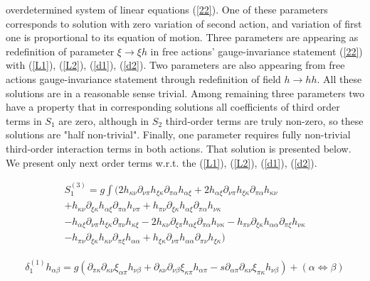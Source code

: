 \documentclass[a4paper,12pt]{article}
\begin{document}
overdetermined system of linear equations (\ref{22}). One of these
parameters corresponds to solution with zero variation of second
action, and variation of first one is proportional to its equation
of motion. Three parameters are appearing as redefinition of
parameter $\xi \rightarrow \xi h$ in free actions'
gauge-invariance statement (\ref{22}) with (\ref{L1}), (\ref{L2}),
(\ref{d1}), (\ref{d2}). Two parameters are also appearing from
free actions gauge-invariance statement through redefinition of
field $h\rightarrow hh$. All these solutions are in a reasonable
sense trivial. Among remaining three parameters two have a
property that in corresponding solutions all coefficients of third
order terms in $S_{1}$ are zero, although in $S_{2}$ third-order
terms are truly non-zero, so these solutions are "half
non-trivial". Finally, one parameter requires fully non-trivial
third-order interaction terms in both actions. That solution is
presented below. We present only next order terms w.r.t. the
(\ref{L1}), (\ref{L2}), (\ref{d1}), (\ref{d2}).


\begin{equation}
\begin{array}{l}
 S_1^{(3)}  = g\int {(2h_{\kappa \nu } \partial _{\nu \pi } h_{\xi \kappa } \partial _{\pi \alpha } h_{\alpha \xi } }
  + 2h_{\alpha \xi } \partial _{\nu \pi } h_{\xi \kappa } \partial
_{\pi \alpha } h_{\kappa \nu }   \\+ h_{\kappa \nu } \partial
_{\xi \kappa } h_{\alpha \xi } \partial _{\pi \alpha } h_{\nu \pi
}  +
  h_{\pi \nu } \partial _{\xi \kappa } h_{\alpha \xi } \partial _{\pi \alpha } h_{\nu \kappa } \\
 - h_{\alpha \xi } \partial _{\nu \pi } h_{\xi \kappa } \partial _{\pi \nu } h_{\kappa \xi }
 - 2h_{\kappa \nu } \partial _{\xi \pi } h_{\alpha \xi } \partial _{\pi \alpha } h_{\nu \kappa }  - h_{\pi \nu } \partial _{\xi \kappa } h_{\alpha \alpha } \partial _{\pi \xi } h_{\nu \kappa } \\
    -  h_{\pi \nu } \partial _{\xi \kappa } h_{\kappa \nu } \partial _{\pi \xi } h_{\alpha \alpha }  + h_{\xi \kappa } \partial _{\nu \pi } h_{\alpha \alpha } \partial _{\pi \nu } h_{\xi \kappa } )
\end{array}
\end{equation}

\begin{equation}
\begin{array}{l}
\delta _1^{(1)} h_{\alpha \beta }  = g(\partial _{\pi \kappa }
\partial _{\kappa \nu } \xi _{\alpha \pi } h_{\nu \beta }  +
\partial _{\kappa \nu } \partial _{\nu \beta } \xi _{\kappa \pi }
h_{\alpha \pi }  - s\partial _{\alpha \pi } \partial _{\kappa \nu
} \xi _{\pi \kappa } h_{\nu \beta } ) + (\alpha  \Leftrightarrow
\beta )
\end{array}
\end{equation}
\end{document}
